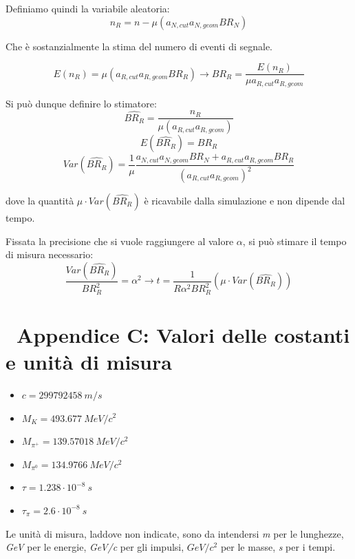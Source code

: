 \documentclass[8pt]{extarticle}
\begin{document}
Definiamo quindi la variabile aleatoria:
$$
n_R = n - \mu (a_{N,cut}a_{N,geom}BR_N)
$$

Che è sostanzialmente la stima del numero di eventi di segnale. 

$$
E(n_R) = \mu (a_{R,cut}a_{R,geom}BR_R) \rightarrow BR_R = \frac{E(n_R)}{\mu a_{R,cut}a_{R,geom}}
$$

Si può dunque definire lo stimatore:
$$
\widehat{BR_R} = \frac{n_R}{\mu (a_{R,cut}a_{R,geom})}
$$
$$
E(\widehat{BR_R}) = BR_R
$$
$$
Var(\widehat{BR_R}) = \frac{1}{\mu} \frac{a_{N,cut}a_{N,geom}BR_N + a_{R,cut}a_{R,geom}BR_R}{(a_{R,cut}a_{R,geom})^2}
$$

dove la quantità $\mu \cdot Var(\widehat{BR_R})$ è ricavabile dalla simulazione e non dipende dal tempo.

Fissata la precisione che si vuole raggiungere al valore $\alpha$, si può stimare il tempo di misura necessario: 
$$
\frac{Var(\widehat{BR_R})}{BR_R^2} = \alpha^2 \rightarrow t = \frac{1}{R \alpha^2 BR_R^2} (\mu \cdot Var(\widehat{BR_R}))
$$

\section{\ Appendice C: Valori delle costanti e unità di misura}

\begin{itemize}
\item $c = 299792458\ m/s$
\item $M_K = 493.677\ MeV/c^2$
\item $M_{\pi^{+}} = 139.57018\ MeV/c^2$
\item $M_{\pi^0} = 134.9766\ MeV/c^2$
\item $\tau = 1.238\cdot 10^{-8}\ s$
\item $\tau_\pi = 2.6\cdot 10^{-8}\ s$
\end{itemize}

Le unità di misura, laddove non indicate, sono da intendersi \textit{m} per le lunghezze, \textit{GeV} per le energie, \textit{GeV/c} per gli impulsi, \textit{$GeV/c^2$} per le masse, \textit{s} per i tempi.


\end{document}

